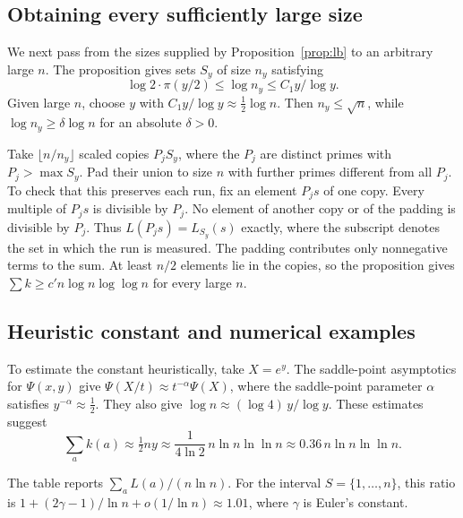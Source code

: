 \documentclass[11pt]{article}
\theoremstyle{remark}
\begin{document}
\subsection{Obtaining every sufficiently large size}

We next pass from the sizes supplied by Proposition~\ref{prop:lb} to an arbitrary large $n$.
The proposition gives sets $S_y$ of size $n_y$ satisfying
\[
  \log 2\cdot\pi(y/2)\le\log n_y\le C_1y/\log y.
\]
Given large $n$, choose $y$ with $C_1y/\log y\approx\frac12\log n$.
Then $n_y\le\sqrt n$, while $\log n_y\ge\delta\log n$ for an absolute $\delta>0$.

Take $\lfloor n/n_y\rfloor$ scaled copies $P_jS_y$, where the $P_j$ are distinct primes with $P_j>\max S_y$.
Pad their union to size $n$ with further primes different from all $P_j$.
To check that this preserves each run, fix an element $P_js$ of one copy.
Every multiple of $P_js$ is divisible by $P_j$.
No element of another copy or of the padding is divisible by $P_j$.
Thus $L(P_js)=L_{S_y}(s)$ exactly, where the subscript denotes the set in which the run is measured.
The padding contributes only nonnegative terms to the sum.
At least $n/2$ elements lie in the copies, so the proposition gives $\sum k\ge c'n\log n\log\log n$ for every large $n$.

\subsection{Heuristic constant and numerical examples}

To estimate the constant heuristically, take $X=e^{y}$.
The saddle-point asymptotics for $\Psi(x,y)$ give $\Psi(X/t)\approx t^{-\alpha}\Psi(X)$, where the saddle-point parameter $\alpha$ satisfies $y^{-\alpha}\approx\tfrac12$.
They also give $\log n\approx(\log 4)\,y/\log y$.
These estimates suggest
\[
  \sum_a k(a)\approx\tfrac12 ny\approx\frac{1}{4\ln 2}\,n\ln n\ln\ln n\approx 0.36\,n\ln n\ln\ln n.
\]

The table reports $\sum_a L(a)/(n\ln n)$.
For the interval $S=\{1,\dots,n\}$, this ratio is $1+(2\gamma-1)/\ln n+o(1/\ln n)\approx 1.01$, where $\gamma$ is Euler's constant.
\end{document}
